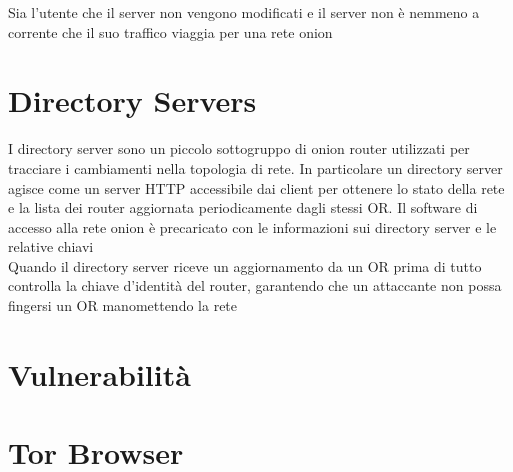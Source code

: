 Sia l'utente che il server non vengono modificati e il server non è nemmeno a corrente che il suo traffico viaggia per una rete onion \cite{ChaumMixes}

\section{Directory Servers}
I directory server sono un piccolo sottogruppo di onion router utilizzati per tracciare i cambiamenti nella topologia di rete. In particolare un directory server agisce come un server HTTP accessibile dai client per ottenere lo stato della rete e la lista dei router aggiornata periodicamente dagli stessi OR. Il software di accesso alla rete onion è precaricato con le informazioni sui directory server e le relative chiavi \\
Quando il directory server riceve un aggiornamento da un OR prima di tutto controlla la chiave d'identità del router, garantendo che un attaccante non possa fingersi un OR manomettendo la rete \cite{ChaumMixes}

\section{Vulnerabilità} %
\section{Tor Browser}
